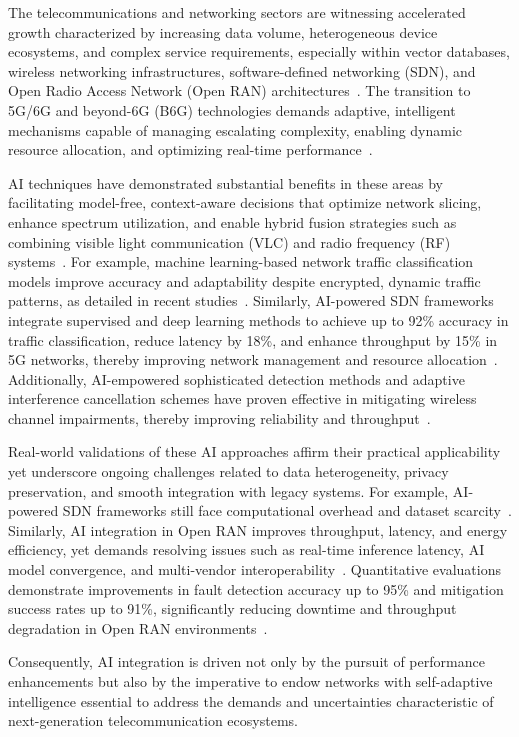 \documentclass[sigconf]{acmart}
\begin{document}
The telecommunications and networking sectors are witnessing accelerated growth characterized by increasing data volume, heterogeneous device ecosystems, and complex service requirements, especially within vector databases, wireless networking infrastructures, software-defined networking (SDN), and Open Radio Access Network (Open RAN) architectures~\cite{ref21,ref22,ref23}. The transition to 5G/6G and beyond-6G (B6G) technologies demands adaptive, intelligent mechanisms capable of managing escalating complexity, enabling dynamic resource allocation, and optimizing real-time performance~\cite{ref24,ref25}. 

AI techniques have demonstrated substantial benefits in these areas by facilitating model-free, context-aware decisions that optimize network slicing, enhance spectrum utilization, and enable hybrid fusion strategies such as combining visible light communication (VLC) and radio frequency (RF) systems~\cite{ref51,ref52}. For example, machine learning-based network traffic classification models improve accuracy and adaptability despite encrypted, dynamic traffic patterns, as detailed in recent studies~\cite{ref51}. Similarly, AI-powered SDN frameworks integrate supervised and deep learning methods to achieve up to 92\% accuracy in traffic classification, reduce latency by 18\%, and enhance throughput by 15\% in 5G networks, thereby improving network management and resource allocation~\cite{ref52}. Additionally, AI-empowered sophisticated detection methods and adaptive interference cancellation schemes have proven effective in mitigating wireless channel impairments, thereby improving reliability and throughput~\cite{ref54,ref55}. 

Real-world validations of these AI approaches affirm their practical applicability yet underscore ongoing challenges related to data heterogeneity, privacy preservation, and smooth integration with legacy systems. For example, AI-powered SDN frameworks still face computational overhead and dataset scarcity~\cite{ref52}. Similarly, AI integration in Open RAN improves throughput, latency, and energy efficiency, yet demands resolving issues such as real-time inference latency, AI model convergence, and multi-vendor interoperability~\cite{ref54,ref55}. Quantitative evaluations demonstrate improvements in fault detection accuracy up to 95\% and mitigation success rates up to 91\%, significantly reducing downtime and throughput degradation in Open RAN environments~\cite{ref55}. 

Consequently, AI integration is driven not only by the pursuit of performance enhancements but also by the imperative to endow networks with self-adaptive intelligence essential to address the demands and uncertainties characteristic of next-generation telecommunication ecosystems.
\end{document}
